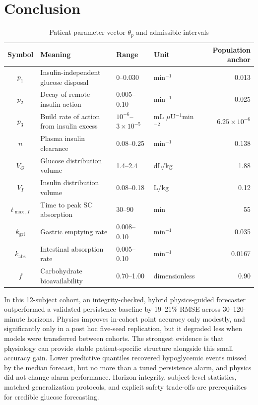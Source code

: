 \documentclass[journal]{IEEEtran}
\begin{document}
\section{Conclusion}
\begin{table}[t]
\centering
\caption{Patient-parameter vector $\theta_p$ and admissible intervals}
\label{tab:params}
\footnotesize
\begin{tabular}{clllr}
\toprule
Symbol & Meaning & Range & Unit & Population anchor \\
\midrule
$p_1$ & Insulin-independent glucose disposal & 0--0.030 & min$^{-1}$ & 0.013 \\
$p_2$ & Decay of remote insulin action & 0.005--0.10 & min$^{-1}$ & 0.025 \\
$p_3$ & Build rate of action from insulin excess & $10^{-6}$--$3\times10^{-5}$ & mL $\mu$U$^{-1}$min$^{-2}$ & $6.25\times10^{-6}$ \\
$n$ & Plasma insulin clearance & 0.08--0.25 & min$^{-1}$ & 0.138 \\
$V_G$ & Glucose distribution volume & 1.4--2.4 & dL/kg & 1.88 \\
$V_I$ & Insulin distribution volume & 0.08--0.18 & L/kg & 0.12 \\
$t_{\max,I}$ & Time to peak SC absorption & 30--90 & min & 55 \\
$k_{\text{gri}}$ & Gastric emptying rate & 0.008--0.10 & min$^{-1}$ & 0.035 \\
$k_{\text{abs}}$ & Intestinal absorption rate & 0.005--0.10 & min$^{-1}$ & 0.0167 \\
$f$ & Carbohydrate bioavailability & 0.70--1.00 & dimensionless & 0.90 \\
\bottomrule
\end{tabular}
\end{table}

In this 12-subject cohort, an integrity-checked, hybrid physics-guided forecaster outperformed a validated persistence baseline by 19--21\% RMSE across 30--120-minute horizons. Physics improves in-cohort point accuracy only modestly, and significantly only in a post hoc five-seed replication, but it degraded less when models were transferred between cohorts. The strongest evidence is that physiology can provide stable patient-specific structure alongside this small accuracy gain. Lower predictive quantiles recovered hypoglycemic events missed by the median forecast, but no more than a tuned persistence alarm, and physics did not change alarm performance. Horizon integrity, subject-level statistics, matched generalization protocols, and explicit safety trade-offs are prerequisites for credible glucose forecasting.
\end{document}
